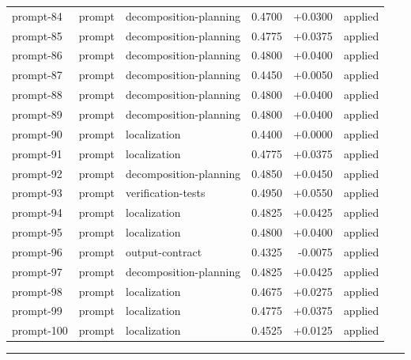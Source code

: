 \begin{center}
\begin{longtable}{llp{5.2cm}rrl}
prompt-84 & prompt & decomposition-planning & 0.4700 & +0.0300 & applied \\
prompt-85 & prompt & decomposition-planning & 0.4775 & +0.0375 & applied \\
prompt-86 & prompt & decomposition-planning & 0.4800 & +0.0400 & applied \\
prompt-87 & prompt & decomposition-planning & 0.4450 & +0.0050 & applied \\
prompt-88 & prompt & decomposition-planning & 0.4800 & +0.0400 & applied \\
prompt-89 & prompt & decomposition-planning & 0.4800 & +0.0400 & applied \\
prompt-90 & prompt & localization & 0.4400 & +0.0000 & applied \\
prompt-91 & prompt & localization & 0.4775 & +0.0375 & applied \\
prompt-92 & prompt & decomposition-planning & 0.4850 & +0.0450 & applied \\
prompt-93 & prompt & verification-tests & 0.4950 & +0.0550 & applied \\
prompt-94 & prompt & localization & 0.4825 & +0.0425 & applied \\
prompt-95 & prompt & localization & 0.4800 & +0.0400 & applied \\
prompt-96 & prompt & output-contract & 0.4325 & -0.0075 & applied \\
prompt-97 & prompt & decomposition-planning & 0.4825 & +0.0425 & applied \\
prompt-98 & prompt & localization & 0.4675 & +0.0275 & applied \\
prompt-99 & prompt & localization & 0.4775 & +0.0375 & applied \\
prompt-100 & prompt & localization & 0.4525 & +0.0125 & applied \\
\bottomrule\end{longtable}\end{center}
\par\bigskip\hrule\bigskip
